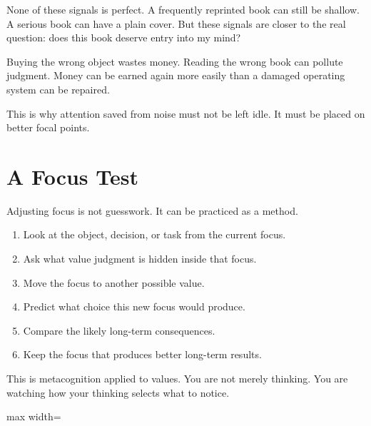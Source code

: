 None of these signals is perfect. A frequently reprinted book can still be shallow. A serious book can have a plain cover. But these signals are closer to the real question: does this book deserve entry into my mind?

Buying the wrong object wastes money. Reading the wrong book can pollute judgment. Money can be earned again more easily than a damaged operating system can be repaired.

This is why attention saved from noise must not be left idle. It must be placed on better focal points.

\section*{A Focus Test}

Adjusting focus is not guesswork. It can be practiced as a method.

\begin{enumerate}
\item Look at the object, decision, or task from the current focus.
\item Ask what value judgment is hidden inside that focus.
\item Move the focus to another possible value.
\item Predict what choice this new focus would produce.
\item Compare the likely long-term consequences.
\item Keep the focus that produces better long-term results.
\end{enumerate}

This is metacognition applied to values. You are not merely thinking. You are watching how your thinking selects what to notice.

\begin{center}
\begin{adjustbox}{max width=\linewidth}
\end{adjustbox}
\end{center}

